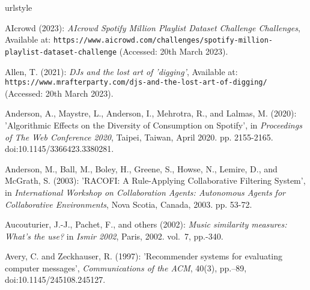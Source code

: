 \documentclass[11pt,titlepage,oneside]{book}
\begin{document}
\begin{thebibliography}{97}
	\newcommand{\enquote}[1]{\textit{#1}}
	\providecommand{\natexlab}[1]{#1}
	\providecommand{\url}[1]{\texttt{#1}}
	\providecommand{\urlprefix}{Available at: }
	\expandafter\ifx\csname urlstyle\endcsname\relax
	\providecommand{\doi}[1]{doi:\discretionary{}{}{}#1}\else
	\providecommand{\doi}{doi:\discretionary{}{}{}\begingroup
		\urlstyle{rm}\Url}\fi
	
	AIcrowd (2023): \enquote{{AIcrowd} {\textbar} {Spotify} {Million} {Playlist}
		{Dataset} {Challenge} {\textbar} {Challenges}},
	\urlprefix\url{https://www.aicrowd.com/challenges/spotify-million-playlist-dataset-challenge} (Accessed: 20th March 2023).
	
	Allen, T. (2021): \enquote{{DJs} and the lost art of 'digging'},
	\urlprefix\url{https://www.mrafterparty.com/djs-and-the-lost-art-of-digging/} (Accessed: 20th March 2023).
	
	Anderson, A., Maystre, L., Anderson, I., Mehrotra, R., and Lalmas, M. (2020):
	'Algorithmic {Effects} on the {Diversity} of {Consumption} on
		{Spotify}', in \textit{Proceedings of {The} {Web} {Conference} 2020}, Taipei,
	Taiwan, April 2020. pp. 2155-2165. \doi{10.1145/3366423.3380281}.
	
	Anderson, M., Ball, M., Boley, H., Greene, S., Howse, N., Lemire, D., and
	McGrath, S. (2003): '{RACOFI}: {A} {Rule}-{Applying} {Collaborative}
		{Filtering} {System}', in \textit{International Workshop on Collaboration Agents: Autonomous Agents for Collaborative Environments}, Nova Scotia, Canada, 2003. pp. 53-72.
	
	Aucouturier, J.-J., Pachet, F., and {others} (2002): \enquote{Music similarity
		measures: {What}'s the use?} in \textit{Ismir 2002}, Paris, 2002. vol.~7, pp.-340.
	
	Avery, C. and Zeckhauser, R. (1997): 'Recommender systems for
		evaluating computer messages', \textit{Communications of the ACM}, 40(3),
	pp.--89, \doi{10.1145/245108.245127}.
	

\end{thebibliography}
\end{document}
